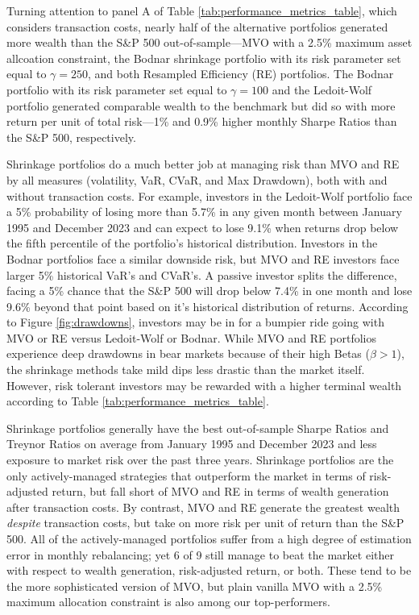 \documentclass[12pt,letterpaper]{article}
\begin{document}
Turning attention to panel A of Table \ref{tab:performance_metrics_table}, which considers transaction costs, nearly half of the alternative portfolios generated more wealth than the S\&P 500 out-of-sample---MVO with a 2.5\% maximum asset allcoation constraint, the Bodnar shrinkage portfolio with its risk parameter set equal to $\gamma=250$, and both Resampled Efficiency (RE) portfolios. The Bodnar portfolio with its risk parameter set equal to $\gamma=100$ and the Ledoit-Wolf portfolio generated comparable wealth to the benchmark but did so with more return per unit of total risk---1\% and 0.9\% higher monthly Sharpe Ratios than the S\&P 500, respectively.

Shrinkage portfolios do a much better job at managing risk than MVO and RE by all measures (volatility, VaR, CVaR, and Max Drawdown), both with and without transaction costs. For example, investors in the Ledoit-Wolf portfolio face a 5\% probability of losing more than 5.7\% in any given month between January 1995 and December 2023 and can expect to lose 9.1\% when returns drop below the fifth percentile of the portfolio's historical distribution. Investors in the Bodnar portfolios face a similar downside risk, but MVO and RE investors face larger 5\% historical VaR's and CVaR's. A passive investor splits the difference, facing a 5\% chance that the S\&P 500 will drop below 7.4\% in one month and lose 9.6\% beyond that point based on it's historical distribution of returns. According to Figure \ref{fig:drawdowns}, investors may be in for a bumpier ride going with MVO or RE versus Ledoit-Wolf or Bodnar. While MVO and RE portfolios experience deep drawdowns in bear markets because of their high Betas ($\beta>1$), the shrinkage methods take mild dips less drastic than the market itself. However, risk tolerant investors may be rewarded with a higher terminal wealth according to Table \ref{tab:performance_metrics_table}.

Shrinkage portfolios generally have the best out-of-sample Sharpe Ratios and Treynor Ratios on average from January 1995 and December 2023 and less exposure to market risk over the past three years. Shrinkage portfolios are the only actively-managed strategies that outperform the market in terms of risk-adjusted return, but fall short of MVO and RE in terms of wealth generation after transaction costs. By contrast, MVO and RE generate the greatest wealth \textit{despite} transaction costs, but take on more risk per unit of return than the S\&P 500. All of the actively-managed portfolios suffer from a high degree of estimation error in monthly rebalancing; yet 6 of 9 still manage to beat the market either with respect to wealth generation, risk-adjusted return, or both. These tend to be the more sophisticated version of MVO, but plain vanilla MVO with a 2.5\% maximum allocation constraint is also among our top-performers.
\end{document}
